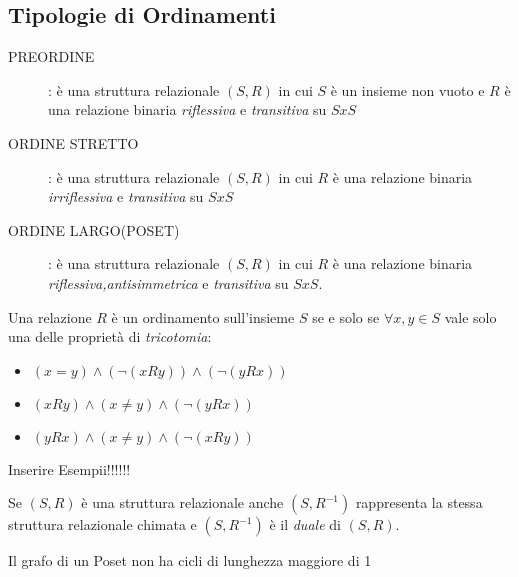 \subsection{Tipologie di Ordinamenti}
\begin{description}
    \item[PREORDINE]: è una struttura relazionale $(S,R)$ in cui $S$ è un insieme non vuoto
          e $R$ è una relazione binaria \emph{riflessiva} e \emph{transitiva} su $S x S$
    \item[ORDINE STRETTO]: è una struttura relazionale $(S,R)$ in cui $R$ è una
          relazione binaria \emph{irriflessiva} e \emph{transitiva} su $S x S$
    \item[ORDINE LARGO(POSET)]: è una struttura relazionale $(S,R)$ in cui $R$ è una
          relazione binaria \emph{riflessiva,antisimmetrica} e \emph{transitiva} su $S x S$.
\end{description}

Una relazione $R$ è un ordinamento sull'insieme $S$ se e solo se $\forall x,y \in S$
vale solo una delle proprietà di \emph{tricotomia}:
\begin{itemize}
    \item $(x = y) \land (\neg(xRy)) \land (\neg(yRx))$
    \item $(xRy) \land (x \neq y) \land (\neg(yRx))$
    \item $(yRx) \land (x \neq y) \land (\neg(xRy))$
\end{itemize}

Inserire Esempii!!!!!!

\begin{prop}
Se $(S,R)$ è una struttura relazionale anche $(S,R^{-1})$ rappresenta la stessa
struttura relazionale chimata e $(S,R^{-1})$ è il \emph{duale} di $(S,R)$.
\end{prop}


\begin{prop}
Il grafo di un Poset non ha cicli di lunghezza maggiore di 1
\end{prop}

